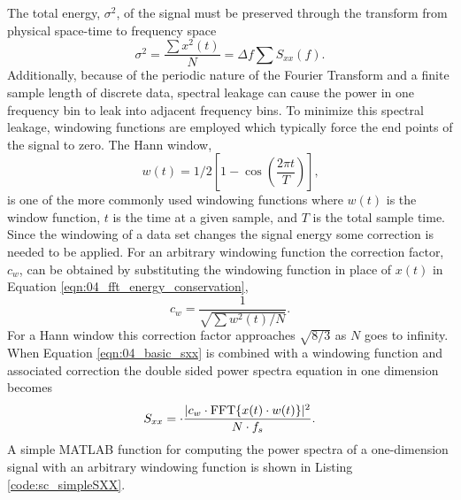 The total energy, $\sigma^2$, of the signal must be preserved through the transform from physical space-time to frequency space
\begin{equation}
  \sigma^2 = \frac{\sum x^2(t)}{N} = \Delta f\sum S_{xx}(f) \textrm{.}
  \label{eqn:04_fft_energy_conservation}
\end{equation}
Additionally, because of the periodic nature of the Fourier Transform and a finite sample length of discrete data, spectral leakage can cause the power in one frequency bin to leak into adjacent frequency bins.
To minimize this spectral leakage, windowing functions are employed which typically force the end points of the signal to zero.
The Hann window,
\begin{equation}
 w(t) = 1/2\left[1-\cos\left(\frac{2\pi t}{T}\right)\right] \textrm{,}
 \label{eqn:04_hann_window}
\end{equation}
is one of the more commonly used windowing functions where $w(t)$ is the window function, $t$ is the time at a given sample, and $T$ is the total sample time.
Since the windowing of a data set changes the signal energy some correction is needed to be applied.
For an arbitrary windowing function the correction factor, $c_w$, can be obtained by substituting the windowing function in place of $x(t)$ in Equation \ref{eqn:04_fft_energy_conservation},
\begin{equation}
 c_w = \frac{1}{\sqrt{\sum w^2(t)/N}} \textrm{.}
 \label{eqn:04_window_correction}
\end{equation}
For a Hann window this correction factor approaches $\sqrt{8/3}$ as $N$ goes to infinity.
When Equation \ref{eqn:04_basic_sxx} is combined with a windowing function and associated correction the double sided power spectra equation in one dimension becomes
\begin{equation}
 S_{xx} = \cdot\frac{|c_w\cdot\operatorname{FFT}\{x(t)\cdot w(t)\}|^2}{N\cdot f_{s}} \textrm{.}
 \label{eqn:04_windowed_sxx}
\end{equation}
A simple MATLAB function for computing the power spectra of a one-dimension signal with an arbitrary windowing function is shown in Listing \ref{code:sc_simpleSXX}.

